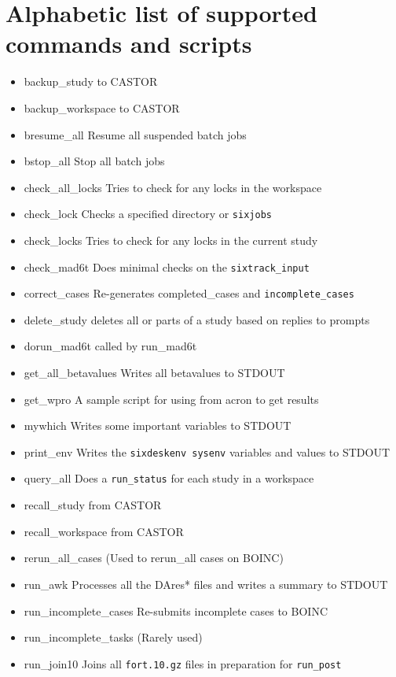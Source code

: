 \documentclass{cernatsnote}
\begin{document}
\section{Alphabetic list of supported commands and scripts}
\label{sec:commandlist}
\begin{itemize}
\item backup\_study to CASTOR
\item backup\_workspace to CASTOR
\item bresume\_all Resume all suspended batch jobs
\item bstop\_all Stop all batch jobs
\item check\_all\_locks Tries to check for any locks in the workspace
\item check\_lock Checks a specified directory or \texttt{sixjobs}
\item check\_locks Tries to check for any locks in the current study
\item check\_mad6t Does minimal checks on the \texttt{sixtrack\_input}
\item correct\_cases Re-generates {completed\_cases} and \texttt{incomplete\_cases}
\item delete\_study deletes all or parts of a study based on replies to prompts
\item dorun\_mad6t called by run\_mad6t
\item get\_all\_betavalues Writes all betavalues to STDOUT
\item get\_wpro A sample script for using from acron to get results
\item mywhich Writes some important variables to STDOUT
\item print\_env Writes the \texttt{sixdeskenv sysenv} variables and values to STDOUT
\item query\_all Does a \texttt{run\_status} for each study in a workspace
\item recall\_study from CASTOR
\item recall\_workspace from CASTOR
\item rerun\_all\_cases (Used to rerun\_all cases on BOINC)
\item run\_awk Processes all the DAres* files and writes a summary to STDOUT
\item run\_incomplete\_cases Re-submits incomplete cases to BOINC
\item run\_incomplete\_tasks (Rarely used)
\item run\_join10 Joins all \texttt{fort.10.gz} files in preparation for \texttt{run\_post}

\end{itemize}
\end{document}
